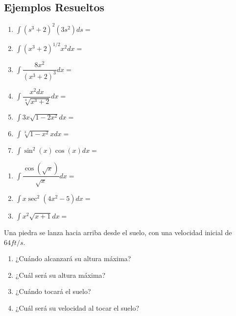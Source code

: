  \subsection{Ejemplos Resueltos}


 
  \begin{problema}
   \begin{enumerate}
    \item $\int \left( s^{3}+2 \right)^{2}(3s^{2})ds=$ 
    \item $\int \left( x^{3}+2 \right)^{1/2}x^{2}dx=$ 
    \item $\int \dfrac{8x^{2}}{\left( x^{3}+2 \right)^{3}}dx=$
    
    \item $\int\dfrac{x^{2}dx}{\sqrt[4]{x^{3}+2}}dx=$
    
    \item $\int 3x\sqrt{1-2x^{2}}dx=$
    
    \item $\int \sqrt[3]{1-x^{2}}xdx=$
    
    \item $\int \sin^{2}(x)\cos(x)dx=$
   \end{enumerate}


  \end{problema}

 


 \begin{problema}
  \begin{enumerate}
   \item $\int \dfrac{\cos(\sqrt{x})}{\sqrt{x}}dx=$
   
   \item $\int x\sec^{2}(4x^{2}-5)dx=$
   
   \item $\int x^{2}\sqrt{x+1} dx=$
  \end{enumerate}

 \end{problema}




 
  \begin{problema}
  \label{soc:solved:22.19}
   Una piedra se lanza hacia arriba desde el suelo, con una velocidad inicial de $64ft/s.$
   \begin{enumerate}
    \item ¿Cuándo alcanzará su altura máxima?
    \item ¿Cuál será su altura máxima?
    \item ¿Cuándo tocará el suelo?
    \item ¿Cuál será su velocidad al tocar el suelo?
   \end{enumerate}

  \end{problema}

